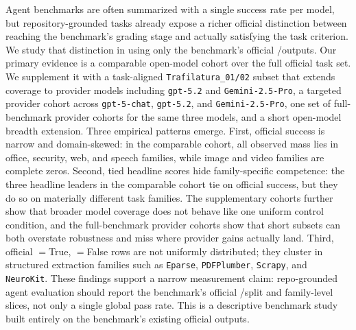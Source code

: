 Agent benchmarks are often summarized with a single success rate per model, but
repository-grounded tasks already expose a richer official distinction between
reaching the benchmark's grading stage and actually satisfying the task
criterion. We study that distinction in \gittaskbench using only the
benchmark's official \processmetric/\resultmetric outputs. Our primary
evidence is a comparable open-model cohort over the full official task set. We
supplement it with a task-aligned \texttt{Trafilatura\_01/02} subset that
extends coverage to provider models including \texttt{gpt-5.2} and
\texttt{Gemini-2.5-Pro}, a targeted provider cohort across
\texttt{gpt-5-chat}, \texttt{gpt-5.2}, and \texttt{Gemini-2.5-Pro}, one set of
full-benchmark provider cohorts for the same three models, and a short
open-model breadth extension. Three empirical patterns emerge. First,
official \resultmetric success is narrow and domain-skewed: in the comparable
cohort, all observed \resultmetric mass lies in office, security, web, and
speech families, while image and video families are complete zeros. Second,
tied headline scores hide family-specific competence: the three headline
leaders in the comparable cohort tie on official \resultmetric success, but
they do so on materially different task families. The supplementary cohorts
further show that broader model coverage
does not behave like one uniform control condition, and the full-benchmark
provider cohorts show that short subsets can both overstate robustness and miss
where provider gains actually land. Third, official
\processmetric$=$True,
\resultmetric$=$False rows are not uniformly distributed; they cluster in
structured extraction families such as \texttt{Eparse}, \texttt{PDFPlumber},
\texttt{Scrapy}, and \texttt{NeuroKit}. These findings support a narrow
measurement claim: repo-grounded agent evaluation should report the benchmark's
official \processmetric/\resultmetric split and family-level slices, not only a
single global pass rate. This is a descriptive benchmark study built entirely
on the benchmark's existing official outputs.
